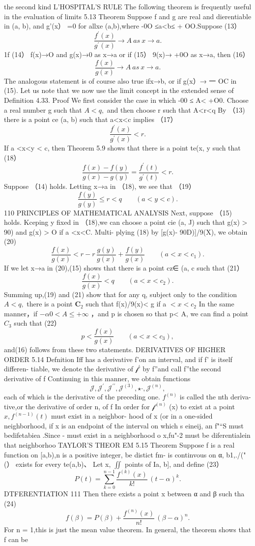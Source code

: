 the second kind L'HOSPITAL'S RULE The following theorem is frequently useful in the evaluation of limits 5.13 Theorem Suppose f and g are real and dierentiable in (a, b), and g'(x） =0 for allxe (a,b),where -0O ≤a<b≤ + OO.Suppose (13） $$ \frac{f^{\prime}(x)}{g^{\prime}(x)}\to A\ a s\ x\to a. $$ 1f (14） f(x)→O and g(x)→0 as x→a or if (15） 9(x)→ +0O as x→a, then (16） $$ {\frac{f(x)}{g(x)}}\to A\ a s\ x\to a. $$ The analogous statement is of course also true ifx→b, or if g(x）→ 一 OC in (15). Let us note that we now use the limit concept in the extended sense of Definition 4.33. Proof We first consider the case in which -00 ≤ A< +O0. Choose a real number g such that $A<q,$ and then choose r such that A<r<q By （13) there is a point ce (a, b) such that a<x<c implies （17） $$ {\frac{f^{\prime}(x)}{g^{\prime}(x)}}<r. $$ If a <x<y < c, then Theorem 5.9 shows that there is a point te(x, y such that (18） $$ {\frac{f(x)-f(y)}{g(x)-g(y)}}={\frac{f^{\prime}(t)}{g^{\prime}(t)}}<r. $$ Suppose （14) holds. Letting x→a in （18), we see that （19） $$ {\frac{f(y)}{g(y)}}\leq r<q\qquad(a<y<c). $$110 PRINCIPLES OF MATHEMATICAL ANALYSIS Next, suppose （15) holds. Kceping y fixed in （18),we can choose a point cie (a, J) such that g(x) > 90) and g(x) > O if a <x<C. Multi- plying (18) by [g(x)- 90D)]/9(X), we obtain (20) $$ {\frac{f(x)}{g(x)}}<r-r\,{\frac{g(y)}{g(x)}}+{\frac{f(y)}{g(x)}}\qquad(a<x<c_{1}). $$ If we let x→a in (20),(15) shows that there is a point cz∈ (a, c such that (21） $$ {\frac{f(x)}{g(x)}}<q\qquad(a<x<c_{2}). $$ Summing up,(19) and (21) show that for any q, subject only to the condition $A<q,$ there is a point ${\boldsymbol{C}}_{\textstyle2}$ such that f(x)/9(x)< g if a $<x<c_{2}$ In the same manner，if $-\alpha0<A\leq+\infty$ ，and p is chosen so that p< A, we can find a point $C_{3}$ such that (22） $$ p<\frac{f(x)}{g(x)}\;\;\;\;\;\;\;(a<x<c_{3}), $$ and(16) follows from these two statements. DERIVATIVES OF HIGHER ORDER 5.14 Defnition Iff has a derivative f’on an interval, and if f' is itself differen- tiable, we denote the derivative of ${\mathcal{f}}^{\prime}$ by f”and call f”the second derivative of f Continuing in this manner, we obtain functions $$ \mathcal{J},\mathcal{J}^{\prime},\mathcal{J}^{\prime\prime},\mathcal{J}^{(3)},\star\cdot,\mathcal{J}^{(n)}, $$ each of which is the derivative of the preceding one. $f^{(n)}$ is called the nth deriva- tive,or the derivative of order n, of f In order for ${\mathcal{f}}^{(n)}$ (x) to exist at a point $x,f^{(n-1)}\left(t\right)$ must exist in a neighbor- hood of x (or in a one-sided neighborhood, if x is an endpoint of the interval on which s eineij, an f"“S must bedifetabiea .Since - must exist in a neighborhood o x,fu"-2 must be diferentialein that neighborhoo TAYLOR'S THEOR EM 5.15 Theorem Suppose f is a real function on [a,b),n is a positive integer, be distict fm- is continvous on α, b1,./("(） exists for every te(a,b)、 Let x, $\textstyle\iint$ points of Ia, b], and define (23） $$ P(t)=\sum_{k=0}^{n-1}{\frac{f^{(k)}(x)}{k!}}\,(t-\alpha)^{k}. $$DTFERENTIATION 111 Then there exists a point x between α and β such tha (24) $$ f(\beta)=P(\beta)+\frac{f^{(n)}(x)}{n!}\,(\beta-\alpha)^{n}. $$ For n = 1,this is just the mean value theorem. In general, the theorem shows that f can be 